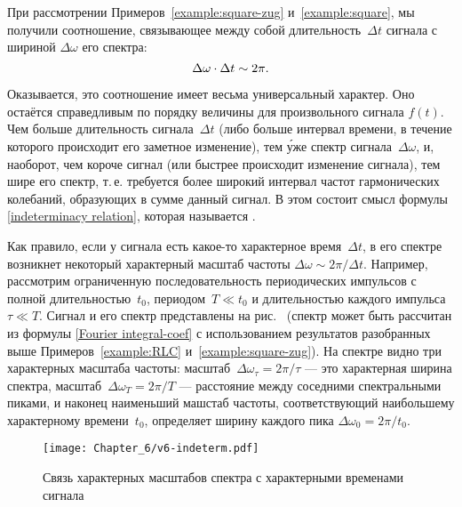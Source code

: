 При рассмотрении Примеров~\ref{example:square-zug} и~\ref{example:square},
мы получили соотношение, связывающее между собой
длительность~$\Delta t$ сигнала с шириной $\Delta \omega$ его спектра:
\begin{equation}
    \eqmark{indeterminacy relation}
    \Delta\omega \cdot \Delta t \sim 2\pi.
\end{equation}

Оказывается, это соотношение имеет весьма универсальный характер.
Оно остаётся справедливым по порядку величины для произвольного сигнала $f(t)$.
Чем больше длительность сигнала~$\Delta t$ (либо больше интервал времени,
в течение которого происходит его заметное изменение), тем \'{у}же спектр
сигнала~$\Delta\omega$, и, наоборот, чем короче сигнал (или быстрее происходит
изменение сигнала), тем шире его спектр, т.\,е. требуется более широкий интервал
частот гармонических колебаний, образующих в сумме данный сигнал.
В этом состоит смысл формулы \eqref{indeterminacy relation},
которая называется .

Как правило, если у сигнала есть какое-то характерное время~$\Delta t$,
в его спектре возникнет некоторый характерный масштаб
частоты $\Delta \omega \sim 2\pi / \Delta t$. Например, рассмотрим ограниченную
последовательность периодических импульсов с полной длительностью~$t_0$,
периодом~$T\ll t_0$ и длительностью каждого импульса~$\tau\ll T$.
Сигнал и его спектр представлены на рис.~
(спектр может быть рассчитан из формулы \eqref{Fourier integral-coef}
с использованием результатов разобранных выше Примеров~\ref{example:RLC}
и~\ref{example:square-zug}). На спектре видно три характерных масштаба частоты:
масштаб~$\Delta \omega_{\tau} = 2\pi/\tau$ --- это характерная ширина спектра,
масштаб~$\Delta \omega_T = 2\pi / T$ --- расстояние между соседними
спектральными пиками, и наконец наименьший машстаб частоты,
соответствующий наибольшему характерному времени~$t_0$, 
определяет ширину каждого пика $\Delta \omega_0 = 2\pi /t_0$.


\begin{figure}[h!]
\centering\texttt{[image: Chapter\_6/v6-indeterm.pdf]}
\caption{Связь характерных масштабов спектра 
    с характерными временами сигнала}
\end{figure}


